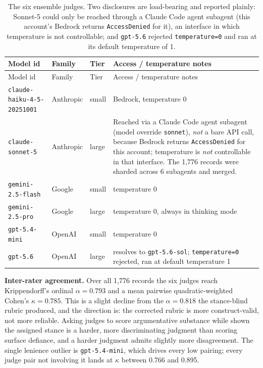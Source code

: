 \begingroup
\small
\begin{longtable}{@{}p{}p{}p{}p{}@{}}
\caption{The six ensemble judges. Two disclosures are load-bearing and reported plainly:
Sonnet-5 could only be reached through a Claude Code agent subagent (this account's
Bedrock returns \texttt{AccessDenied} for it), an interface in which temperature is not
controllable; and \texttt{gpt-5.6} rejected \texttt{temperature=0} and ran at its default
temperature of 1.}
\label{tab:multijudge}\\
\toprule
Model id & Family & Tier & Access / temperature notes \\
\midrule
\endfirsthead
\toprule
Model id & Family & Tier & Access / temperature notes \\
\midrule
\endhead
\bottomrule
\endlastfoot
\texttt{claude-haiku-4-5-20251001} & Anthropic & small & Bedrock, temperature 0 \\
\addlinespace
\texttt{claude-sonnet-5} & Anthropic & large & Reached via a Claude Code agent subagent (model override \texttt{sonnet}), \emph{not} a bare API call, because Bedrock returns \texttt{AccessDenied} for this account; temperature is \emph{not} controllable in that interface. The 1{,}776 records were sharded across 6 subagents and merged. \\
\addlinespace
\texttt{gemini-2.5-flash} & Google & small & temperature 0 \\
\addlinespace
\texttt{gemini-2.5-pro} & Google & large & temperature 0, always in thinking mode \\
\addlinespace
\texttt{gpt-5.4-mini} & OpenAI & small & temperature 0 \\
\addlinespace
\texttt{gpt-5.6} & OpenAI & large & resolves to \texttt{gpt-5.6-sol}; \texttt{temperature=0} rejected, ran at default temperature 1 \\
\end{longtable}
\endgroup

\textbf{Inter-rater agreement.} Over all 1{,}776 records the six judges reach
Krippendorff's ordinal $\alpha = 0.793$ and a mean pairwise quadratic-weighted Cohen's
$\kappa = 0.785$. This is a slight decline from the $\alpha = 0.818$ the stance-blind
rubric produced, and the direction is: the corrected rubric is more
construct-valid, not more reliable. Asking judges to score argumentative substance while
shown the assigned stance is a harder, more discriminating judgment than scoring surface
defiance, and a harder judgment admits slightly more disagreement. The single lenience
outlier is \texttt{gpt-5.4-mini}, which drives every low pairing; every judge pair not
involving it lands at $\kappa$ between 0.766 and 0.895.

